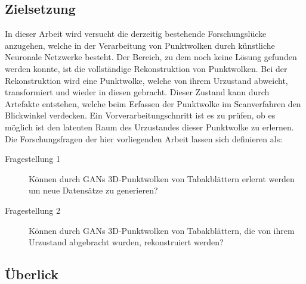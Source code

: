 \documentclass{llncs}
\begin{document}
\subsection{Zielsetzung}\label{ref:objective}

In dieser Arbeit wird versucht die derzeitig bestehende Forschungslücke anzugehen, welche in der Verarbeitung von Punktwolken durch künstliche Neuronale Netzwerke besteht. Der Bereich, zu dem noch keine Lösung gefunden werden konnte, ist die vollständige Rekonstruktion von Punktwolken. Bei der Rekonstruktion wird eine Punktwolke, welche von ihrem Urzustand abweicht, transformiert und wieder in diesen gebracht. Dieser Zustand kann durch Artefakte entstehen, welche beim Erfassen der Punktwolke im Scanverfahren den Blickwinkel verdecken. Ein Vorverarbeitungschnritt ist es zu prüfen, ob es möglich ist den latenten Raum des Urzustandes dieser Punktwolke zu erlernen. Die Forschungsfragen der hier vorliegenden Arbeit lassen sich definieren als:\\
\begin{description}
	\item[Fragestellung 1]
	Können durch GANs 3D-Punktwolken von Tabakblättern erlernt werden um neue Datensätze zu generieren?\\
	
	\item[Fragestellung 2] Können durch GANs 3D-Punktwolken von Tabakblättern, die von ihrem Urzustand abgebracht wurden, rekonstruiert werden? 
\end{description}
\subsection{Überlick}
\end{document}
